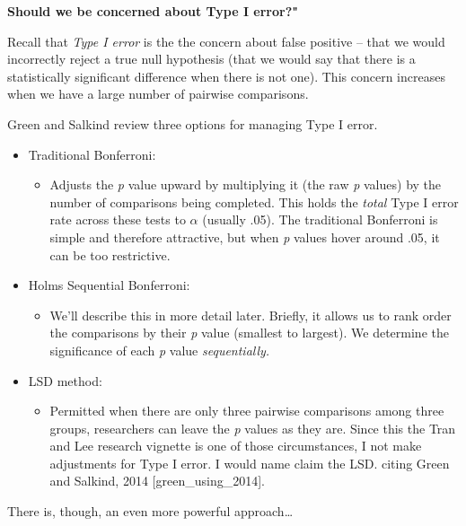 \documentclass[
  english,
]{book}
\providecommand{\tightlist}{%
  \setlength{\itemsep}{0pt}\setlength{\parskip}{0pt}}
\begin{document}
\textbf{Should we be concerned about Type I error?"}

Recall that \emph{Type I error} is the the concern about false positive -- that we would incorrectly reject a true null hypothesis (that we would say that there is a statistically significant difference when there is not one). This concern increases when we have a large number of pairwise comparisons.

Green and Salkind \citeyearpar{green_using_2014} review three options for managing Type I error.

\begin{itemize}
\tightlist
\item
  Traditional Bonferroni:

  \begin{itemize}
  \tightlist
  \item
    Adjusts the \emph{p} value upward by multiplying it (the raw \emph{p} values) by the number of comparisons being completed. This holds the \emph{total} Type I error rate across these tests to \(\alpha\) (usually .05). The traditional Bonferroni is simple and therefore attractive, but when \emph{p} values hover around .05, it can be too restrictive.
  \end{itemize}
\item
  Holms Sequential Bonferroni:

  \begin{itemize}
  \tightlist
  \item
    We'll describe this in more detail later. Briefly, it allows us to rank order the comparisons by their \emph{p} value (smallest to largest). We determine the significance of each \emph{p} value \emph{sequentially.}\\
  \end{itemize}
\item
  LSD method:

  \begin{itemize}
  \tightlist
  \item
    Permitted when there are only three pairwise comparisons among three groups, researchers can leave the \emph{p} values as they are. Since this the Tran and Lee \citeyearpar{tran_you_2014} research vignette is one of those circumstances, I not make adjustments for Type I error. I would name claim the LSD. citing Green and Salkind, 2014 {[}green\_using\_2014{]}.
  \end{itemize}
\end{itemize}

There is, though, an even more powerful approach\ldots{}
\end{document}
